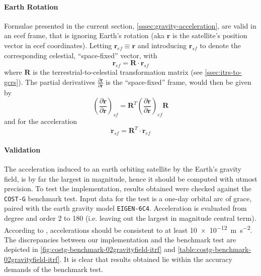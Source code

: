 \paragraph{Earth Rotation}\label{sssec:gravity-acceleration-earth-rotation}

Formulae presented in the current section, \autoref{sssec:gravity-acceleration}, 
are valid in an \gls{ecef} frame, that is ignoring Earth's rotation (aka $\bm{r}$ is 
the satellite's position vector in \gls{ecef} coordinates). Letting 
$\bm{r}_{ef} \equiv \bm{r}$ and introducing $\bm{r}_{sf}$ to denote the corresponding 
celestial, ``space-fixed'' vector, with
\begin{equation}
  \bm{r}_{ef} = \bm{R} \cdot \bm{r}_{sf}
\end{equation}
where $\bm{R}$ is the terrestrial-to-celestial transformation matrix (see 
\autoref{ssec:itrs-to-gcrs}). The partial derivatives 
$\frac{\partial \bm{\ddot{r}}}{\partial \bm{r}}$ is the ``space-fixed'' 
frame, would then be given by
\begin{equation}
  \left( \frac{\partial \bm{\ddot{r}}}{\partial \bm{r}} \right) _{sf} = 
  \bm{R}^T 
  \left( \frac{\partial \bm{\ddot{r}}}{\partial \bm{r}} \right) _{ef}
  \bm{R}
\end{equation}
and for the acceleration
\begin{equation}
  \bm{\ddot{r}}_{sf} = \bm{R}^T \cdot \bm{\ddot{r}}_{ef}
\end{equation}

\paragraph{Validation}\label{sssec:gravity-acceleration-acceleration}

The acceleration induced to an earth orbiting satellite by the Earth's gravity 
field, is by far the largest in magnitude, hence it should be computed with utmost 
precision. To test the implementation, results obtained were checked against the 
\texttt{COST-G} benchmark test. Input data for the test is a one-day orbital arc 
of \gls{grace}, paired with the earth gravity model \texttt{EIGEN-6C4}. Acceleration 
is evaluated from degree and order 2 to 180 (i.e. leaving out the largest in 
magnitude central term). According to \cite{Lasser23}, accelerations should be 
consistent to at least \SI{10e-12}{\metre\per\square\second}. The discrepancies 
between our implementation and the benchmark test are depicted in 
\autoref{fig:costg-benchmark-02gravityfield-itrf} and 
\autoref{table:costg-benchmark-02gravityfield-itrf}. It is clear that results 
obtained lie within the accuracy demands of the benchmark test.

